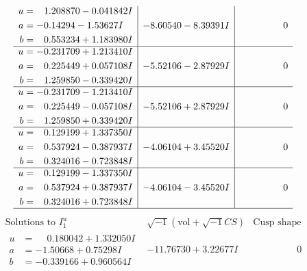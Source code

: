 \documentclass[1p]{elsarticle_modified}
\theoremstyle{definition}
\newcommand{\I}{\sqrt{-1}}
\begin{document}
$$\begin{array}{c|c|c}
\begin{aligned}
u &= \phantom{-}1.208870 - 0.041842 I \\
a &= -0.14294 - 1.53627 I \\
b &= \phantom{-}0.553234 + 1.183980 I\end{aligned}
 & -8.60540 - 8.39391 I & \phantom{-0.000000 } 0 \\ \hline\begin{aligned}
u &= -0.231709 + 1.213410 I \\
a &= \phantom{-}0.225449 + 0.057108 I \\
b &= \phantom{-}1.259850 - 0.339420 I\end{aligned}
 & -5.52106 - 2.87929 I & \phantom{-0.000000 } 0 \\ \hline\begin{aligned}
u &= -0.231709 - 1.213410 I \\
a &= \phantom{-}0.225449 - 0.057108 I \\
b &= \phantom{-}1.259850 + 0.339420 I\end{aligned}
 & -5.52106 + 2.87929 I & \phantom{-0.000000 } 0 \\ \hline\begin{aligned}
u &= \phantom{-}0.129199 + 1.337350 I \\
a &= \phantom{-}0.537924 - 0.387937 I \\
b &= \phantom{-}0.324016 - 0.723848 I\end{aligned}
 & -4.06104 + 3.45520 I & \phantom{-0.000000 } 0 \\ \hline\begin{aligned}
u &= \phantom{-}0.129199 - 1.337350 I \\
a &= \phantom{-}0.537924 + 0.387937 I \\
b &= \phantom{-}0.324016 + 0.723848 I\end{aligned}
 & -4.06104 - 3.45520 I & \phantom{-0.000000 } 0\\
 \hline 
 \end{array}$$\newpage$$\begin{array}{c|c|c}  
\text{Solutions to }I^u_{1}& \I (\text{vol} + \sqrt{-1}CS) & \text{Cusp shape}\\
 \hline 
\begin{aligned}
u &= \phantom{-}0.180042 + 1.332050 I \\
a &= -1.50668 + 0.75298 I \\
b &= -0.339166 + 0.960564 I\end{aligned}
 & -11.76730 + 3.22677 I & \phantom{-0.000000 } 0 \\ \hline\begin{aligned}

\end{aligned}
\end{array}$$
\end{document}
